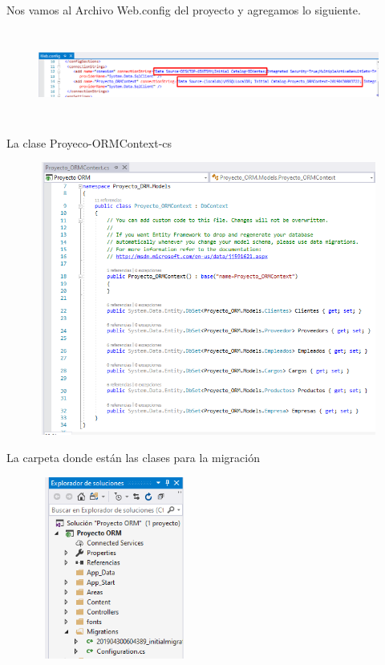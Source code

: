 \documentclass[12pt,a4paper,oneside]{book}
\begin{document}
\begin{enumerate}
\begin{enumerate}
\begin{enumerate}
							Nos vamos al Archivo Web.config del proyecto y agregamos lo siguiente.\\
								\begin{figure}[htb]
									\centering \includegraphics[width=12cm, height=3cm]{img/Migraciones/1webconfig.png}
								\end{figure}
				\newpage			
							La clase Proyeco-ORMContext-cs \\
								\begin{figure}[htb]
									\centering \includegraphics[width=12cm, height=9cm]{img/Migraciones/2Context.png}
								\end{figure}
							
							La carpeta donde est\'an las clases para la migraci\'on \\
								\begin{figure}[htb]
									\centering \includegraphics[width=5cm,height=6cm]{img/Migraciones/3clases.png}
								\end{figure}
					

\end{enumerate}
\end{enumerate}
\end{enumerate}
\end{document}
